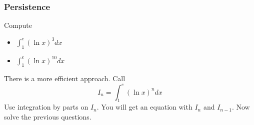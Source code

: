 \begin{frame}[t]
	\frametitle{Persistence}
	Compute
	\begin{multicols}{2}
		\begin{itemize}
			\item $\displaystyle \int_{1}^{e}\left( \ln x \right)^{3}dx$
				\vspace{.2cm}

			\item $\displaystyle \int_{1}^{e}\left( \ln x \right)^{10}dx$
		\end{itemize}
	\end{multicols}
	There is a more efficient approach. Call
	\[
		I_{n}= \int_{1}^{e}\left( \ln x \right)^{n}dx
	\]
	Use integration by parts on $I_{n}$. You will get an equation with $I_{n}$ and
	$I_{n-1}$. Now solve the previous questions.

	\vfill
	\hfill \href{https://oeis.org/}{}
\end{frame}

